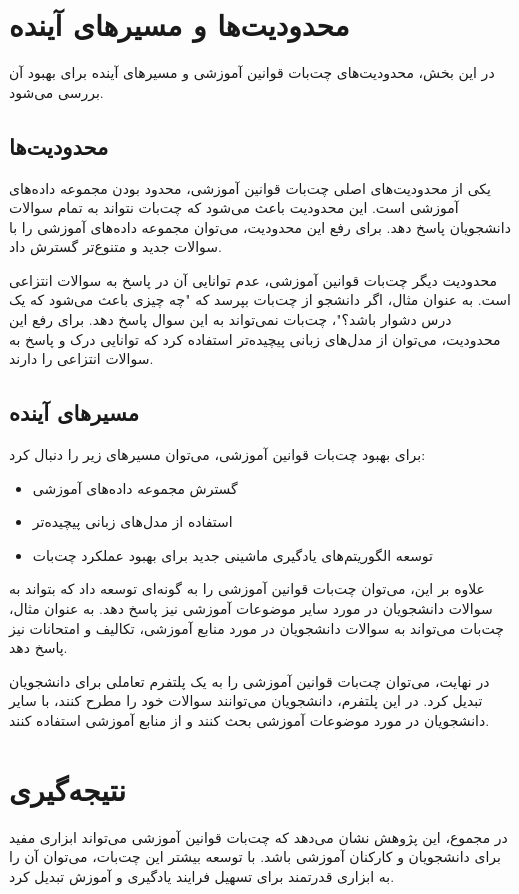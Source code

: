 \section{محدودیت‌ها و مسیرهای آینده}

در این بخش، محدودیت‌های چت‌بات قوانین آموزشی و مسیرهای آینده برای بهبود آن بررسی می‌شود.

\subsection{محدودیت‌ها}

یکی از محدودیت‌های اصلی چت‌بات قوانین آموزشی، محدود بودن مجموعه داده‌های آموزشی است. این محدودیت باعث می‌شود که چت‌بات نتواند به تمام سوالات دانشجویان پاسخ دهد. برای رفع این محدودیت، می‌توان مجموعه داده‌های آموزشی را با سوالات جدید و متنوع‌تر گسترش داد.

محدودیت دیگر چت‌بات قوانین آموزشی، عدم توانایی آن در پاسخ به سوالات انتزاعی است. به عنوان مثال، اگر دانشجو از چت‌بات بپرسد که "چه چیزی باعث می‌شود که یک درس دشوار باشد؟"، چت‌بات نمی‌تواند به این سوال پاسخ دهد. برای رفع این محدودیت، می‌توان از مدل‌های زبانی پیچیده‌تر استفاده کرد که توانایی درک و پاسخ به سوالات انتزاعی را دارند.

\subsection{مسیرهای آینده}


برای بهبود چت‌بات قوانین آموزشی، می‌توان مسیرهای زیر را دنبال کرد:

\begin{itemize}
    \item گسترش مجموعه داده‌های آموزشی
    \item استفاده از مدل‌های زبانی پیچیده‌تر
    \item توسعه الگوریتم‌های یادگیری ماشینی جدید برای بهبود عملکرد چت‌بات
\end{itemize}

علاوه بر این، می‌توان چت‌بات قوانین آموزشی را به گونه‌ای توسعه داد که بتواند به سوالات دانشجویان در مورد سایر موضوعات آموزشی نیز پاسخ دهد. به عنوان مثال، چت‌بات می‌تواند به سوالات دانشجویان در مورد منابع آموزشی، تکالیف و امتحانات نیز پاسخ دهد.

در نهایت، می‌توان چت‌بات قوانین آموزشی را به یک پلتفرم تعاملی برای دانشجویان تبدیل کرد. در این پلتفرم، دانشجویان می‌توانند سوالات خود را مطرح کنند، با سایر دانشجویان در مورد موضوعات آموزشی بحث کنند و از منابع آموزشی استفاده کنند.


\section{نتیجه‌گیری}

در مجموع، این پژوهش نشان می‌دهد که چت‌بات قوانین آموزشی می‌تواند ابزاری مفید برای دانشجویان و کارکنان آموزشی باشد. با توسعه بیشتر این چت‌بات، می‌توان آن را به ابزاری قدرتمند برای تسهیل فرایند یادگیری و آموزش تبدیل کرد.

\newpage